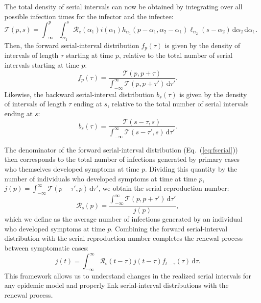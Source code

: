 \documentclass[12pt]{article}
\newcommand{\eref}[1]{Eq.~(\ref{eq:#1})}
\newcommand{\Rx}[1]{\ensuremath{{\mathcal R}_{#1}}\xspace}
\newcommand{\Rc}{\Rx{\mathrm{c}}}
\newcommand{\Rs}{\Rx{\mathrm{s}}}
\newcommand{\dd}[1]{\ensuremath{\, \mathrm{d}#1}}
\newcommand{\dtau}{\dd{\tau}}
\newcommand{\psymp}{\ensuremath{p}} %
\newcommand{\ssymp}{\ensuremath{s}} %
\newcommand{\pinf}{\ensuremath{\alpha_1}} %
\newcommand{\sinf}{\ensuremath{\alpha_2}} %
\newcommand{\idist}{\ell} %
\newcommand{\total}{{\mathcal T}} %
\begin{document}
The total density of serial intervals can now be obtained by integrating over all possible infection times for the infector and the infectee:
\begin{equation}
\total (\psymp,\ssymp) = \int_{-\infty}^{\psymp} \int_{\pinf}^{\ssymp} \Rc (\pinf) i(\pinf) h_{\pinf}(\psymp-\pinf, \sinf - \pinf) \idist_{\sinf}(\ssymp - \sinf) \, \mathrm{d}\sinf\,\mathrm{d}\pinf.
\end{equation}
Then, the forward serial-interval distribution $f_\psymp(\tau)$ is given by the density of intervals of length $\tau$ starting at time \psymp, relative to the total number of serial intervals starting at time \psymp: 
\begin{equation}
f_\psymp(\tau) = 
\frac{\total(\psymp, \psymp+\tau)}{\int_{-\infty}^\infty \total(\psymp, \psymp+\tau') \dtau'}.
\label{eq:fserial}
\end{equation}
Likewise, the backward serial-interval distribution $b_\ssymp(\tau)$ is given by the density of intervals of length $\tau$ ending at \ssymp, relative to the total number of serial intervals ending at \ssymp: 
\begin{equation}
b_\ssymp(\tau) = 
\frac{\total(\ssymp-\tau, \ssymp)}{\int_{-\infty}^\infty \total(\ssymp-\tau', \ssymp) \dtau'}.
\label{eq:bserial}
\end{equation}

The denominator of the forward serial-interval distribution (\eref{fserial}) then corresponds to the total number of infections generated by primary cases who themselves developed symptoms at time \psymp.
Dividing this quantity by the number of individuals who developed symptoms at time at time \psymp, $j(\psymp) = \int_{-\infty}^\infty \total(\psymp-\tau', \psymp) \dtau'$, we obtain the serial reproduction number:
\begin{equation}
\Rs(\psymp) = \frac{\int_{-\infty}^\infty \total(\psymp, \psymp+\tau') \dtau'}{j(\psymp)},
\end{equation}
which we define as the average number of infections generated by an individual who developed symptoms at time \psymp.
Combining the forward serial-interval distribution with the serial reproduction number completes the renewal process between symptomatic cases:
\begin{equation}
j(t) = \int_{-\infty}^\infty \Rs(t-\tau) j(t-\tau) f_{t-\tau}(\tau) \dtau.
\label{eq:jrenew}
\end{equation}
This framework allows us to understand changes in the realized serial intervals for any epidemic model and properly link serial-interval distributions with the renewal process.
\end{document}
